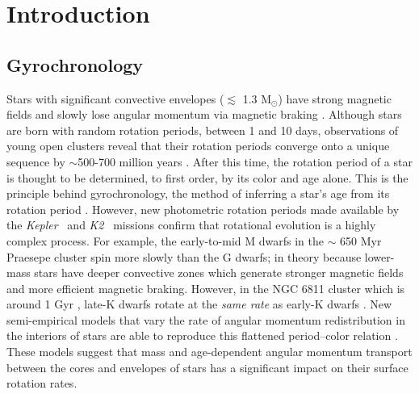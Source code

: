 \documentclass{aastex63}
\newcommand{\eg}{{\it e.g.}}
\newcommand{\kepler}{{\it Kepler}}
\newcommand{\Ktwo}{{\it K2}}
\newcommand{\ktwo}{\Ktwo}
\begin{document}

\section{Introduction}

\subsection{Gyrochronology}

Stars with significant convective envelopes ($\lesssim$ 1.3 M$_\odot$) have
strong magnetic fields and slowly lose angular momentum via magnetic braking
\citep[\eg][]{schatzman1962, weber1967, kraft1967, skumanich1972, kawaler1988,
pinsonneault1989}.
Although stars are born with random rotation periods, between 1 and 10 days,
observations of young open clusters reveal that their rotation periods
converge onto a unique sequence by $\sim$500-700 million years
\citep[\eg][]{irwin2009, gallet2013}.
After this time, the rotation period of a star is thought to be determined, to
first order, by its color and age alone.
This is the principle behind gyrochronology, the method of inferring a
star’s age from its rotation period \citep[\eg][]{barnes2003, barnes2007,
barnes2010, meibom2011, meibom2015}.
However, new photometric rotation periods made available by the \kepler\
\citep{borucki2010} and \ktwo\ \citep{howell2014} missions
\citep[\eg][]{mcquillan2014, garcia2014, douglas2017, rebull2017, meibom2011,
meibom2015, curtis2019} confirm that rotational evolution is a highly complex
process.
For example, the early-to-mid M dwarfs in the $\sim$ 650 Myr Praesepe cluster
spin more slowly than the G dwarfs; in theory because lower-mass stars have
deeper convective zones which generate stronger magnetic fields and more
efficient magnetic braking.
However, in the NGC 6811 cluster which is around 1 Gyr \citep{janes2011,
sandquist2016},
late-K dwarfs rotate at the {\it same rate} as early-K dwarfs
\citep{curtis2019}.
New semi-empirical models that vary the rate of angular momentum
redistribution in the interiors of stars are able to reproduce this flattened
period--color relation \citep{spada2019}.
These models suggest that mass and age-dependent angular momentum transport
between the cores and envelopes of stars has a significant impact on their
surface rotation rates.
\end{document}
